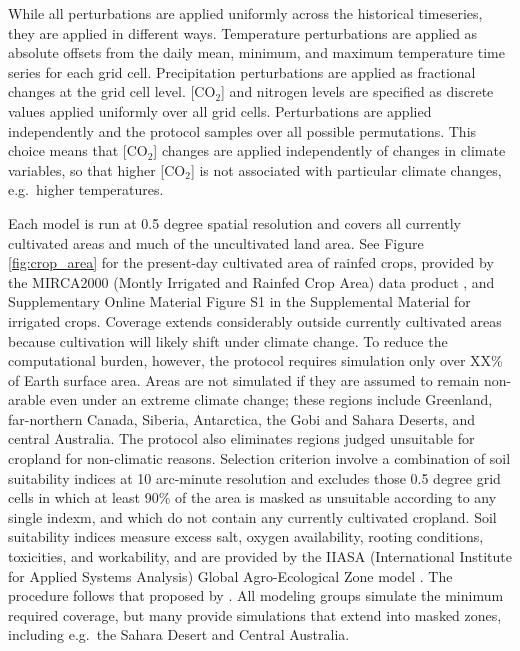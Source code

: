 \documentclass[gmd, manuscript]{copernicus} %
\begin{document}
{While all perturbations are applied uniformly across the historical timeseries, they are applied in different ways. Temperature perturbations are applied as absolute offsets from the daily mean, minimum, and maximum temperature time series for each grid cell.
Precipitation perturbations are applied as fractional changes at the grid cell level. [CO$_2$] and nitrogen levels are specified as discrete values applied uniformly over all grid cells. 
Perturbations are applied independently and the protocol samples over all possible permutations. This choice means that [CO$_2$] changes are applied independently of changes in climate variables, so that higher [CO$_2$] is not associated with particular climate changes, e.g.\ higher temperatures. 

Each model is run at 0.5 degree spatial resolution and covers all currently cultivated areas and much of the uncultivated land area. See Figure \ref{fig:crop_area} for the present-day cultivated area of rainfed crops, provided by the MIRCA2000 (Montly Irrigated and Rainfed Crop Area) data product \citep{Portmann2010}, and Supplementary Online Material Figure S1 in the Supplemental Material for irrigated crops. 
Coverage extends considerably outside currently cultivated areas because cultivation will likely shift under climate change.  
To reduce the computational burden, however, the protocol requires simulation only over XX\% of Earth surface area.  
Areas are not simulated if they are assumed to remain non-arable even under an extreme climate change; these regions include Greenland, far-northern Canada, Siberia, Antarctica, the Gobi and Sahara Deserts, and central Australia. 
The protocol also eliminates regions judged unsuitable for cropland for non-climatic reasons. 
Selection criterion involve a combination of soil suitability indices at 10 arc-minute resolution and excludes those 0.5 degree grid cells in which at least 90\% of the area is masked as unsuitable according to any single indexm, and which do not contain any currently cultivated cropland. %
Soil suitability indices measure excess salt, oxygen availability, rooting conditions, toxicities, and workability, and are provided by the IIASA (International Institute for Applied Systems Analysis) Global Agro-Ecological Zone model \citep[GAEZ, ][]{gaez}. 
The procedure follows that proposed by \citet{pugh_climate_2016}. 
All modeling groups simulate the minimum required coverage, but many provide simulations that extend into masked zones, including e.g.\ the Sahara Desert and Central Australia.

}
\end{document}
